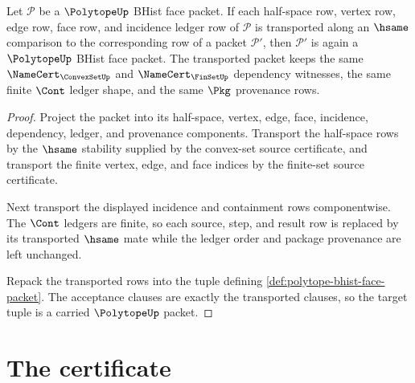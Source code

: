 \begin{theorem}
\label{thm:polytope-halfspace-face-carrier-stability}
Let $\mathcal{P}$ be a $\PolytopeUp$ BHist face packet. If each half-space row,
vertex row, edge row, face row, and incidence ledger row of $\mathcal{P}$ is
transported along an $\hsame$ comparison to the corresponding row of a packet
$\mathcal{P}'$, then $\mathcal{P}'$ is again a $\PolytopeUp$ BHist face packet.
The transported packet keeps the same $\NameCert_{\ConvexSetUp}$ and
$\NameCert_{\FinSetUp}$ dependency witnesses, the same finite $\Cont$ ledger
shape, and the same $\Pkg$ provenance rows.
\end{theorem}
\begin{proof}
Project the packet into its half-space, vertex, edge, face, incidence,
dependency, ledger, and provenance components. Transport the half-space rows by
the $\hsame$ stability supplied by the convex-set source certificate, and
transport the finite vertex, edge, and face indices by the finite-set source
certificate.

Next transport the displayed incidence and containment rows componentwise. The
$\Cont$ ledgers are finite, so each source, step, and result row is replaced by
its transported $\hsame$ mate while the ledger order and package provenance are
left unchanged.

Repack the transported rows into the tuple defining
\autoref{def:polytope-bhist-face-packet}. The acceptance clauses are exactly
the transported clauses, so the target tuple is a carried $\PolytopeUp$ packet.
\end{proof}

\section{The certificate}
\label{sec:polytope-certificate}

